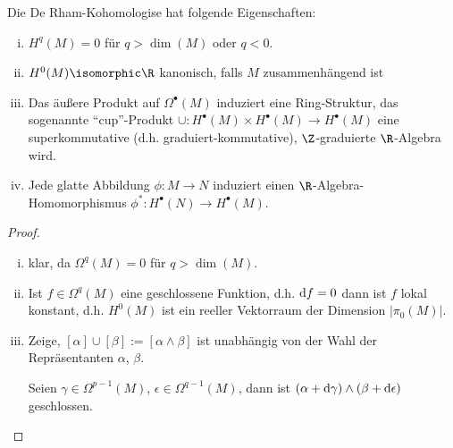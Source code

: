 \begin{lem} \label{6.16}
    Die De Rham-Kohomologise hat folgende Eigenschaften:
    \begin{enumerate}[(i)]
        \item
            $H^q(M) = 0$ für $q > \dim(M)$ oder $q < 0$.
        \item
            $H^0(M) \isomorphic \R$ kanonisch, falls $M$ zusammenhängend ist
        \item
            Das äußere Produkt auf $\Omega^\bullet(M)$ induziert eine Ring-Struktur, das sogenannte “cup”-Produkt $\cup: H^\bullet(M) \times H^\bullet(M) \to H^\bullet(M)$ eine superkommutative (d.h. graduiert-kommutative), $\Z$-graduierte $\R$-Algebra wird.
        \item
            Jede glatte Abbildung $\phi: M \to N$ induziert einen $\R$-Algebra-Homomorphismus
            \begin{math}
                \phi^*: H^\bullet(N) \to H^\bullet(M).
            \end{math}
    \end{enumerate}
    \begin{proof}
        \begin{enumerate}[(i)]
            \item
                klar, da $\Omega^q(M) = 0$ für $q > \dim(M)$.
            \item
                Ist $f \in \Omega^q(M)$ eine geschlossene Funktion, d.h. $\mathrm{d} f = 0$ dann ist $f$ lokal konstant, d.h.
                $H^0(M)$ ist ein reeller Vektorraum der Dimension $|\pi_0(M)|$.
            \item
                Zeige, $[\alpha] \cup [\beta] := [\alpha \wedge \beta]$ ist unabhängig von der Wahl der Repräsentanten $\alpha$, $\beta$.

                Seien $\gamma \in \Omega^{p-1}(M)$, $\epsilon \in \Omega^{q-1}(M)$, dann ist
                $(\alpha + \mathrm{d} \gamma) \wedge (\beta + \mathrm{d} \epsilon)$ geschlossen.


\end{enumerate}
\end{proof}
\end{lem}
